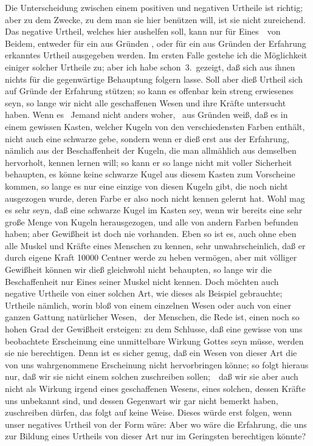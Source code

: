    Die Unterscheidung zwischen einem positiven und negativen Urtheile ist richtig; aber zu dem Zwecke, zu dem man sie hier benützen will, ist sie nicht zureichend. Das negative Urtheil, welches hier aushelfen soll, kann nur für Eines~\ von Beidem, entweder für ein aus Gründen , oder für ein aus Gründen der Erfahrung erkanntes Urtheil ausgegeben werden. Im ersten Falle gestehe ich die Möglichkeit einiger solcher Urtheile zu; aber ich habe schon \no\,3.\ gezeigt, daß sich aus ihnen nichts für die gegenwärtige Behauptung folgern lasse. Soll aber dieß Urtheil sich auf Gründe der Erfahrung stützen; so kann es offenbar kein streng erwiesenes seyn, so lange wir nicht alle geschaffenen Wesen und ihre Kräfte untersucht haben. Wenn es \zB\ Jemand nicht anders woher, \dh\ aus Gründen  weiß, daß es in einem gewissen Kasten, welcher Kugeln von den verschiedensten Farben enthält, nicht auch eine schwarze gebe, sondern wenn er dieß erst aus der Erfahrung, nämlich aus der Beschaffenheit der Kugeln, die man allmählich aus demselben hervorholt, kennen lernen will; so kann er so lange nicht mit voller Sicherheit behaupten, es könne keine schwarze Kugel aus diesem Kasten zum Vorscheine kommen, so lange es nur eine einzige von diesen Kugeln gibt, die noch nicht ausgezogen wurde, deren Farbe er also noch nicht kennen gelernt hat. Wohl mag es sehr  seyn, daß eine schwarze Kugel im Kasten sey, wenn wir bereits eine sehr große Menge von Kugeln herausgezogen, und alle von andern Farben befunden haben; aber Gewißheit ist doch nie vorhanden. Eben so ist es, auch ohne eben alle Muskel und Kräfte eines Menschen zu kennen, sehr unwahrscheinlich, daß er durch eigene Kraft 10000 Centner werde zu heben vermögen, aber mit völliger Gewißheit können wir dieß gleichwohl nicht behaupten, so lange wir die Beschaffenheit nur Eines seiner Muskel nicht kennen. Doch möchten auch negative Urtheile von einer solchen Art, wie dieses als Beispiel gebrauchte; Urtheile nämlich, worin bloß von einem einzelnen Wesen oder auch von einer ganzen Gattung natürlicher Wesen, \zB\ der Menschen, die Rede ist, einen noch so hohen Grad der Gewißheit ersteigen: zu dem Schlusse, daß eine gewisse von uns beobachtete Erscheinung eine unmittelbare Wirkung Gottes seyn müsse, werden sie nie berechtigen. Denn ist es sicher genug, daß ein Wesen von dieser Art die von uns wahrgenommene Erscheinung nicht hervorbringen könne; so folgt hieraus nur, daß wir sie nicht einem solchen zuschreiben sollen;~\ daß wir sie aber auch nicht als Wirkung irgend eines  geschaffenen Wesens, eines solchen, dessen Kräfte uns unbekannt sind, und dessen Gegenwart wir gar nicht bemerkt haben, zuschreiben dürfen, das folgt auf keine Weise. Dieses würde erst folgen, wenn unser negatives Urtheil von der Form wäre:  Aber wo wäre die Erfahrung, die uns zur Bildung eines Urtheils von dieser Art nur im Geringsten berechtigen könnte?

